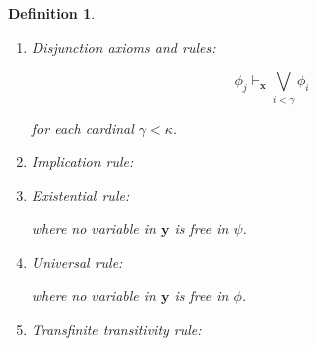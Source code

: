 \documentclass[a4paper,11pt]{article}
\theoremstyle{plain}
\theoremstyle{plain}
\newtheorem{defs}[thm]{Definition}
\theoremstyle{remark}
\begin{document}
\begin{defs}
\begin{enumerate}
\begin{mathpar}
\end{mathpar}

for each cardinal $\gamma<\kappa$.

\item Disjunction axioms and rules:

$$\phi_j \vdash_{\mathbf{x}} \bigvee_{i<\gamma} \phi_i$$

\begin{mathpar}
\end{mathpar}

for each cardinal $\gamma<\kappa$.

\item Implication rule:

\begin{mathpar}
\end{mathpar}

\item Existential rule:
\begin{mathpar}
\end{mathpar}

where no variable in $\mathbf{y}$ is free in $\psi$.

\item Universal rule:
\begin{mathpar}
\end{mathpar}

where no variable in $\mathbf{y}$ is free in $\phi$.

\item Transfinite transitivity rule:


\end{enumerate}
\end{defs}
\end{document}
